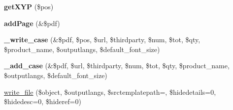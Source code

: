 \begin{DoxyCompactItemize}
{\bfseries get\+X\+YP} (\$pos)
\item 
\mbox{\label{classpdf__palette40_a2e9357ed9fe1b4dbd428d5d3bc8c3a59}} 
{\bfseries add\+Page} (\&\$pdf)
\item 
\mbox{\label{classpdf__palette40_ae412be0b169cb1fab06ef8e3f915e1b6}} 
{\bfseries \+\_\+write\+\_\+case} (\&\$pdf, \$pos, \$url, \$thirdparty, \$num, \$tot, \$qty, \$product\+\_\+name, \$outputlangs, \$default\+\_\+font\+\_\+size)
\item 
\mbox{\label{classpdf__palette40_aad5b121efa50f7035aadbbc9befd1e9d}} 
{\bfseries \+\_\+add\+\_\+case} (\&\$pdf, \$url, \$thirdparty, \$num, \$tot, \$qty, \$product\+\_\+name, \$outputlangs, \$default\+\_\+font\+\_\+size)
\item 
\hyperlink{classpdf__palette40_a6177500b1125aa13a769671bc0a1e231}{write\+\_\+file} (\$object, \$outputlangs, \$srctemplatepath=\textquotesingle{}\textquotesingle{}, \$hidedetails=0, \$hidedesc=0, \$hideref=0)
\end{DoxyCompactItemize}
